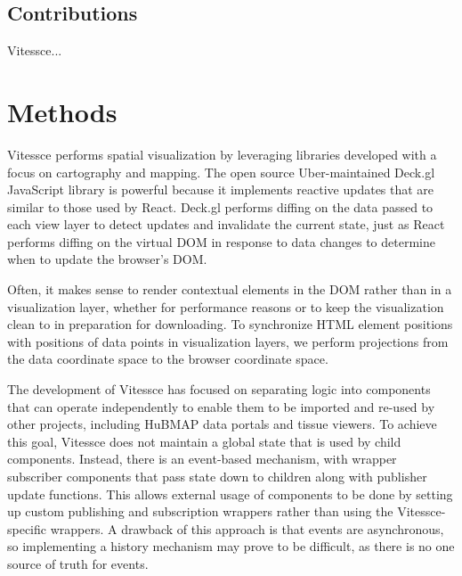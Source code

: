 \documentclass[12pt, letterpaper]{article}
\begin{document}



\subsection{Contributions}
Vitessce...

\section{Methods}

Vitessce performs spatial visualization by leveraging libraries developed with a focus on cartography and mapping.
The open source Uber-maintained Deck.gl JavaScript library is powerful because it implements reactive updates that are similar to those used by React.
Deck.gl performs diffing on the data passed to each view layer to detect updates and invalidate the current state, just as React performs diffing on the virtual DOM in response to data changes to determine when to update the browser's DOM.

Often, it makes sense to render contextual elements in the DOM rather than in a visualization layer, whether for performance reasons or to keep the visualization clean to in preparation for downloading.
To synchronize HTML element positions with positions of data points in visualization layers, we perform projections from the data coordinate space to the browser coordinate space.



The development of Vitessce has focused on separating logic into components that can operate independently to enable them to be imported and re-used by other projects, including HuBMAP data portals and tissue viewers.
To achieve this goal, Vitessce does not maintain a global state that is used by child components.
Instead, there is an event-based mechanism, with wrapper subscriber components that pass state down to children along with publisher update functions.
This allows external usage of components to be done by setting up custom publishing and subscription wrappers rather than using the Vitessce-specific wrappers.
A drawback of this approach is that events are asynchronous, so implementing a history mechanism may prove to be difficult, as there is no one source of truth for events.

\end{document}
